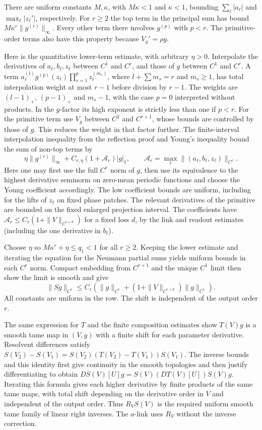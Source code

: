 \documentclass[11pt]{article}
\begin{document}
There are uniform constants \(M,\kappa\), with \(M\kappa<1\) and \(\kappa<1\),
bounding \(\sum_\ell |a_\ell|\) and \(\max_\ell|z_\ell'|\), respectively. For
\(r\ge2\) the top term in the principal sum has bound
\(M\kappa^r\|g^{(r)}\|_\infty\). Every other term there involves \(g^{(p)}\)
with \(p<r\). The primitive-order terms also have this property because
\(V_g'=\rho g\).

Here is the quantitative lower-term estimate, with arbitrary \(\eta>0\).
Interpolate the derivatives of \(a_\ell,b_\ell,z_\ell\) between \(C^1\) and
\(C^r\), and those of \(g\) between \(C^1\) and \(C^r\). A term
\(a_\ell^{(l)}g^{(p)}(z_\ell)\prod_{s=1}^p z_\ell^{(m_s)}\), where
\(l+\sum m_s=r\) and \(m_s\ge1\), has total interpolation weight at most \(r-1\)
before division by \(r-1\). The weights are \((l-1)_+\), \((p-1)_+\) and
\(m_s-1\), with the case \(p=0\) interpreted without products. In the
\(g\)-factor its high exponent is strictly less than one if \(p<r\). For the
primitive term use \(V_g\) between \(C^2\) and \(C^{r+1}\), whose bounds are
controlled by those of \(g\). This reduces the weight in that factor further.
The finite-interval interpolation inequality from the reflection proof and
Young's inequality bound the sum of non-top terms by \[
 \eta\|g^{(r)}\|_\infty+
 C_{r,\eta}(1+\mathcal A_r)|g|_1,
 \qquad \mathcal A_r=\max_\ell\|(a_\ell,b_\ell,z_\ell)\|_{C^r}.
\] Here one may first use the full \(C^r\) norm of \(g\), then use its
equivalence to the highest derivative seminorm on zero-mean periodic functions
and choose the Young coefficient accordingly. The low coefficient bounds are
uniform, including for the lifts of \(z_\ell\) on fixed phase patches. The
relevant derivatives of the primitive are bounded on the fixed enlarged
projection interval. The coefficients have
\(\mathcal A_r\le C_r(1+\|V\|_{C^{r+d}})\) for a fixed loss \(d\), by the link
and readout estimates (including the one derivative in \(b_\ell\)).

Choose \(\eta\) so \(M\kappa^r+\eta\le q_1<1\) for all \(r\ge2\). Keeping the
lower estimate and iterating the equation for the Neumann partial sums yields
uniform bounds in each \(C^r\) norm. Compact embedding from \(C^{r+1}\) and the
unique \(C^1\) limit then show the limit is smooth and give \[
 \|Sg\|_{C^r}\le C_r\left(\|g\|_{C^r}
             +(1+\|V\|_{C^{r+d}})\|g\|_{C^1}\right).
\] All constants are uniform in the row. The shift is independent of the output
order \(r\).

The same expression for \(T\) and the finite composition estimates show
\(T(V)g\) is a smooth tame map in \((V,g)\) with a finite shift for each
parameter derivative. Resolvent differences satisfy
\(S(V_2)-S(V_1)=S(V_2)(T(V_2)-T(V_1))S(V_1)\). The inverse bounds and this
identity first give continuity in the smooth topologies and then justify
differentiating to obtain \(D S(V)[U]g=S(V)(D T(V)[U])S(V)g\). Iterating this
formula gives each higher derivative by finite products of the same tame maps,
with total shift depending on the derivative order in \(V\) and independent of
the output order. Thus \(R_V S(V)\) is the required uniform smooth tame family
of linear right inverses. The \(a\)-link uses \(R_V\) without the inverse
correction.
\end{document}
